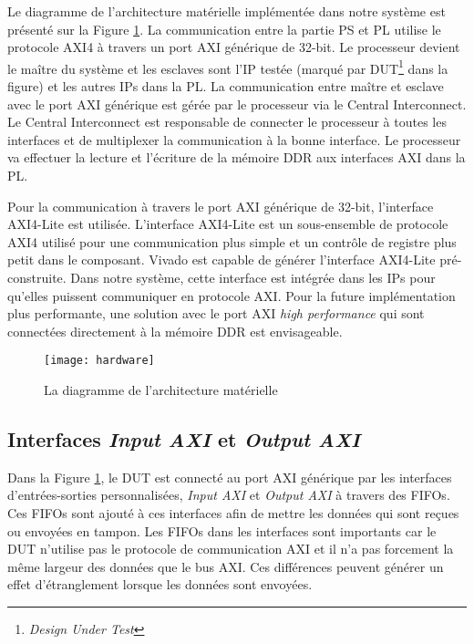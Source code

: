 Le diagramme de l'architecture matérielle implémentée dans notre système est présenté sur la Figure \ref{fig:hard}.
La communication entre la partie PS et PL utilise le protocole AXI4 à travers un port AXI générique
de 32-bit. Le processeur devient le maître du système et les esclaves sont l'IP testée 
(marqué par DUT\footnote{\emph{Design Under Test}} dans la figure) et les autres IPs dans la PL.
La communication entre maître et esclave avec le port AXI générique est gérée par le processeur via le Central Interconnect. 
Le Central Interconnect est responsable de connecter le processeur à toutes les interfaces et de multiplexer
la communication à la bonne interface.
Le processeur va effectuer la lecture et l'écriture de la mémoire DDR aux interfaces AXI dans la PL.

Pour la communication à travers le port AXI générique de 32-bit, l'interface AXI4-Lite est utilisée.
L'interface AXI4-Lite est un sous-ensemble de protocole AXI4 utilisé pour une communication
plus simple et un contrôle de registre plus petit dans le composant. Vivado est capable de générer
l'interface AXI4-Lite pré-construite. Dans notre système, cette interface est
intégrée dans les IPs pour qu'elles puissent communiquer en protocole AXI.
Pour la future implémentation plus performante, une solution avec le port AXI \emph{high performance} qui sont
connectées directement à la mémoire DDR est envisageable. 

\begin{figure}[h]
	\centering
	\texttt{[image: hardware]}
	\caption{La diagramme de l'architecture matérielle}
	\label{fig:hard}
	\vspace{-2mm}
\end{figure}

\subsection{Interfaces \emph{Input AXI} et \emph{Output AXI}}

Dans la Figure \ref{fig:hard}, le DUT est connecté au port AXI générique par les interfaces d'entrées-sorties personnalisées,
\emph{Input AXI} et \emph{Output AXI} à travers des FIFOs. Ces FIFOs sont ajouté à ces interfaces
afin de mettre les données qui sont reçues ou envoyées en tampon.
Les FIFOs dans les interfaces sont importants car le DUT n'utilise pas le protocole
de communication AXI et il n'a pas forcement la même largeur des données que le bus AXI. 
Ces différences peuvent générer un effet d'étranglement lorsque les données sont envoyées.

